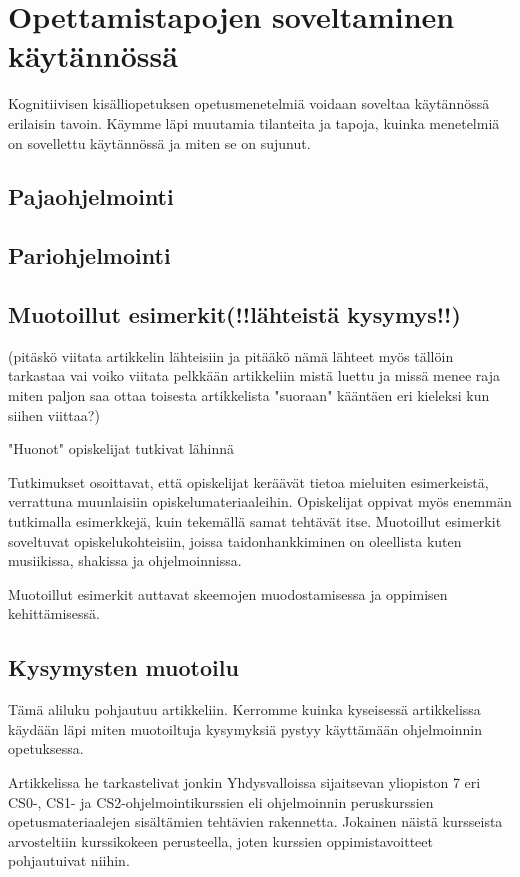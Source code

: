 \documentclass[finnish]{tktltiki2}
\theoremstyle{definition}
\theoremstyle{remark}
\begin{document}
\section{Opettamistapojen soveltaminen käytännössä}
Kognitiivisen kisälliopetuksen opetusmenetelmiä voidaan soveltaa käytännössä erilaisin tavoin. Käymme läpi muutamia tilanteita ja tapoja, kuinka menetelmiä on sovellettu käytännössä ja miten se on sujunut.

\subsection{Pajaohjelmointi}

\subsection{Pariohjelmointi}

\subsection{Muotoillut esimerkit(!!lähteistä kysymys!!)}
(pitäskö viitata artikkelin lähteisiin ja pitääkö nämä lähteet myös tällöin tarkastaa vai voiko viitata pelkkään artikkeliin mistä luettu ja missä menee raja miten paljon saa ottaa toisesta artikkelista "suoraan" kääntäen eri kieleksi kun siihen viittaa?)

"Huonot" opiskelijat tutkivat lähinnä

Tutkimukset osoittavat, että opiskelijat keräävät tietoa mieluiten esimerkeistä, verrattuna muunlaisiin opiskelumateriaaleihin. Opiskelijat oppivat myös enemmän tutkimalla esimerkkejä, kuin tekemällä samat tehtävät itse. Muotoillut esimerkit soveltuvat opiskelukohteisiin, joissa taidonhankkiminen on oleellista kuten musiikissa, shakissa ja ohjelmoinnissa. 

Muotoillut esimerkit auttavat skeemojen muodostamisessa ja oppimisen kehittämisessä. \cite{caspersen2007}

\subsection{Kysymysten muotoilu}
Tämä aliluku pohjautuu \cite{cutts2012} artikkeliin. Kerromme kuinka kyseisessä artikkelissa käydään läpi miten muotoiltuja kysymyksiä pystyy käyttämään ohjelmoinnin opetuksessa.

Artikkelissa he tarkastelivat jonkin Yhdysvalloissa sijaitsevan yliopiston 7 eri CS0-, CS1- ja CS2-ohjelmointikurssien eli ohjelmoinnin peruskurssien opetusmateriaalejen sisältämien tehtävien rakennetta. Jokainen näistä kursseista arvosteltiin kurssikokeen perusteella, joten kurssien oppimistavoitteet pohjautuivat niihin. 
\end{document}
